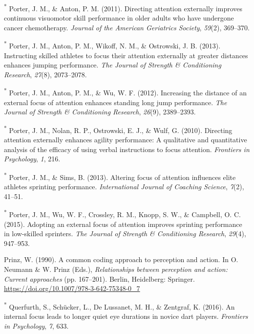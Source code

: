 \documentclass[
  man, donotrepeattitle,floatsintext]{apa7}
\newlength{\cslhangindent}
\newlength{\cslentryspacingunit} %
\newenvironment{CSLReferences}[2] %
 {%
  \setlength{\parindent}{0pt}
  \ifodd #1
  \let\oldpar\par
  \def\par{\hangindent=\cslhangindent\oldpar}
  \fi
  \setlength{\parskip}{#2\cslentryspacingunit}
 }%
 {}
\begin{document}
\begin{CSLReferences}{1}{0}
\leavevmode{}%
\textsuperscript{*} Porter, J. M., \& Anton, P. M. (2011). Directing attention externally improves continuous visuomotor skill performance in older adults who have undergone cancer chemotherapy. \emph{Journal of the American Geriatrics Society}, \emph{59}(2), 369--370.

\leavevmode{}%
\textsuperscript{*} Porter, J. M., Anton, P. M., Wikoff, N. M., \& Ostrowski, J. B. (2013). Instructing skilled athletes to focus their attention externally at greater distances enhances jumping performance. \emph{The Journal of Strength \& Conditioning Research}, \emph{27}(8), 2073--2078.

\leavevmode{}%
\textsuperscript{*} Porter, J. M., Anton, P. M., \& Wu, W. F. (2012). Increasing the distance of an external focus of attention enhances standing long jump performance. \emph{The Journal of Strength \& Conditioning Research}, \emph{26}(9), 2389--2393.

\leavevmode{}%
\textsuperscript{*} Porter, J. M., Nolan, R. P., Ostrowski, E. J., \& Wulf, G. (2010). Directing attention externally enhances agility performance: A qualitative and quantitative analysis of the efficacy of using verbal instructions to focus attention. \emph{Frontiers in Psychology}, \emph{1}, 216.

\leavevmode{}%
\textsuperscript{*} Porter, J. M., \& Sims, B. (2013). Altering focus of attention influences elite athletes sprinting performance. \emph{International Journal of Coaching Science}, \emph{7}(2), 41--51.

\leavevmode{}%
\textsuperscript{*} Porter, J. M., Wu, W. F., Crossley, R. M., Knopp, S. W., \& Campbell, O. C. (2015). Adopting an external focus of attention improves sprinting performance in low-skilled sprinters. \emph{The Journal of Strength \& Conditioning Research}, \emph{29}(4), 947--953.

\leavevmode{}%
Prinz, W. (1990). A common coding approach to perception and action. In O. Neumann \& W. Prinz (Eds.), \emph{Relationships between perception and action: {Current} approaches} (pp. 167--201). {Berlin, Heidelberg}: {Springer}. \url{https://doi.org/10.1007/978-3-642-75348-0_7}

\leavevmode{}%
\textsuperscript{*} Querfurth, S., Schücker, L., De Lussanet, M. H., \& Zentgraf, K. (2016). An internal focus leads to longer quiet eye durations in novice dart players. \emph{Frontiers in Psychology}, \emph{7}, 633.


\end{CSLReferences}
\end{document}
